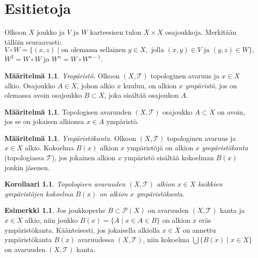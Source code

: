 \documentclass[12pt,a4paper,leqno]{report}
\newcommand{\T}{\mathcal{T}}
\newcommand{\Pot}{\mathcal{P}}
\theoremstyle{plain}
\newtheorem{kor}[equation]{Korollaari}
\theoremstyle{definition}
\newtheorem{maar}[equation]{Määritelmä}
\newtheorem{esim}[equation]{Esimerkki}
\theoremstyle{remark}
\begin{document}
\chapter{Esitietoja}
Olkoon $X$ joukko ja $V$ ja $W$ karteesisen tulon $X\times X$ osajoukkoja.
Merkitään tällöin %
seuraavasti: 
$$V\circ W=\{(x,z)\mid \text{on olemassa sellainen }y \in X,\text{ jolla }(x,y)\in V\text{ ja }(y,z)\in W\},$$ 
$W^2=W\circ W$ ja $W^n=W\circ W^{n-1}$.
\begin{maar}%
\emph{Ympäristö.} 
Olkoon $(X,\T)$ topologinen avaruus ja $x\in X$ alkio. 
Osa\-jouk\-ko $A\in X$, johon alkio $x$ kuuluu, on alkion $x$ \emph{ympäristö}, 
jos on olemassa avoin osajoukko $B\subset X $, joka sisältää osajoukon $A$.
\end{maar}
\begin{maar}
Topologisen avaruuden $(X,\T)$ osajoukko $A\subset X$ on avoin, jos se on 
jokaisen alkionsa $x\in A$ ympäristö.
\end{maar}
\begin{maar}%
\emph{Ympäristökanta.} 
Olkoon $(X,\T)$ topologinen avaruus ja $x\in X$ alkio. 
Kokoelma $B(x)$ alkion $x$ ympäristöjä on alkion $x$ \emph{ympäristökanta} 
(topologiassa $\T$), jos jokainen alkion $x$ ympäristö sisältää 
kokoelman $B(x)$ jonkin jäsenen. 
\end{maar}
\begin{kor}\label{kaikki_ystöt}
Topologisen avaruuden $(X,\T)$ alkion $x\in X$ kaikkien ympäristöjen kokoelma $B(x)$ on alkion $x$ ympäristökanta.
\end{kor}
\begin{esim}
Jos joukkoperhe $B\subset\Pot(X)$ on avaruuden $(X,\T)$ kanta ja 
$x\in X$ alkio, niin joukko 
$B(x)=\{A\mid x\in A\in B\}$ on alkion $x$ eräs ympäristökanta.
Käänteisesti, jos jokaisella alkiolla $x\in X$ on annettu ympäristökanta 
$B(x)$ avaruudessa $(X,\T)$, niin kokoelma $\bigcup\{B(x)\mid x\in X\}$ 
on avaruuden $(X,\T)$ kanta.
\end{esim}
\end{document}
